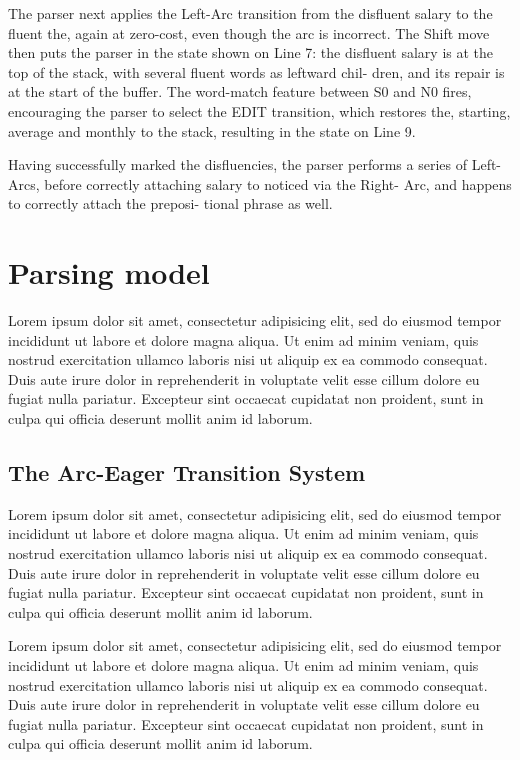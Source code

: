 \documentclass[11pt,letterpaper]{article}
\begin{document}
The parser next applies the Left-Arc transition from the disfluent salary to the
fluent the, again at zero-cost, even though the arc is incorrect. The Shift move
then puts the parser in the state shown on Line 7: the disfluent salary is at
the top of the stack, with several fluent words as leftward chil- dren, and its
repair is at the start of the buffer. The word-match feature between S0 and N0
fires, encouraging the parser to select the EDIT transition, which restores the,
starting, average and monthly to the stack, resulting in the state on Line 9.

Having successfully marked the disfluencies, the parser performs a series of
Left-Arcs, before correctly attaching salary to noticed via the Right- Arc,
and happens to correctly attach the preposi- tional phrase as well.





\section{Parsing model}


Lorem ipsum dolor sit amet, consectetur adipisicing elit, sed do eiusmod tempor incididunt ut labore et dolore magna aliqua. Ut enim ad minim veniam, quis nostrud exercitation ullamco laboris nisi ut aliquip ex ea commodo consequat. Duis aute irure dolor in reprehenderit in voluptate velit esse cillum dolore eu fugiat nulla pariatur. Excepteur sint occaecat cupidatat non proident, sunt in culpa qui officia deserunt mollit anim id laborum.

\subsection{The Arc-Eager Transition System}

Lorem ipsum dolor sit amet, consectetur adipisicing elit, sed do eiusmod tempor incididunt ut labore et dolore magna aliqua. Ut enim ad minim veniam, quis nostrud exercitation ullamco laboris nisi ut aliquip ex ea commodo consequat. Duis aute irure dolor in reprehenderit in voluptate velit esse cillum dolore eu fugiat nulla pariatur. Excepteur sint occaecat cupidatat non proident, sunt in culpa qui officia deserunt mollit anim id laborum.

Lorem ipsum dolor sit amet, consectetur adipisicing elit, sed do eiusmod tempor incididunt ut labore et dolore magna aliqua. Ut enim ad minim veniam, quis nostrud exercitation ullamco laboris nisi ut aliquip ex ea commodo consequat. Duis aute irure dolor in reprehenderit in voluptate velit esse cillum dolore eu fugiat nulla pariatur. Excepteur sint occaecat cupidatat non proident, sunt in culpa qui officia deserunt mollit anim id laborum.
\end{document}
